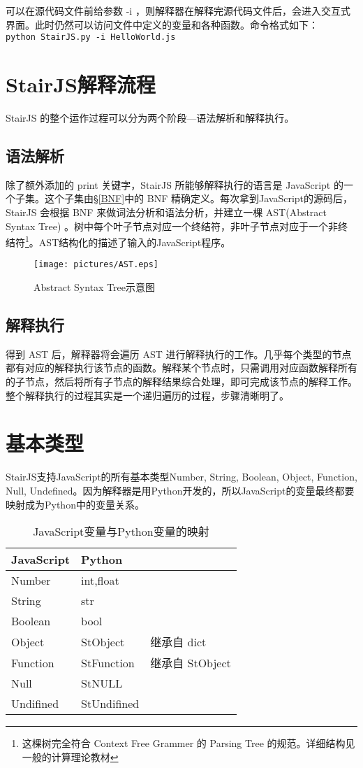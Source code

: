 \documentclass[a4paper]{article}
\begin{document}
\begin{CJK}{UTF8}{gbsn}
            可以在源代码文件前给参数 -i ，则解释器在解释完源代码文件后，会进入交互式界面。此时仍然可以访问文件中定义的变量和各种函数。命令格式如下：\\
            {\tt python StairJS.py -i HelloWorld.js}


\section{StairJS解释流程}
    StairJS 的整个运作过程可以分为两个阶段---语法解析和解释执行。
    \subsection{语法解析}
        除了额外添加的 print 关键字，StairJS 所能够解释执行的语言是 JavaScript 的一个子集。这个子集由\S\ref{BNF}中的 BNF 精确定义。每次拿到JavaScript的源码后， StairJS 会根据 BNF 来做词法分析和语法分析，并建立一棵 AST(Abstract Syntax Tree) 。树中每个叶子节点对应一个终结符，非叶子节点对应于一个非终结符\footnote{这棵树完全符合 Context Free Grammer 的 Parsing Tree 的规范。详细结构见一般的计算理论教材}。AST结构化的描述了输入的JavaScript程序。\\
        \begin{figure}[h]
        \center
        \texttt{[image: pictures/AST.eps]}
        \caption{Abstract Syntax Tree示意图}
        \end{figure}

    \subsection{解释执行}
        得到 AST 后，解释器将会遍历 AST 进行解释执行的工作。几乎每个类型的节点都有对应的解释执行该节点的函数。解释某个节点时，只需调用对应函数解释所有的子节点，然后将所有子节点的解释结果综合处理，即可完成该节点的解释工作。整个解释执行的过程其实是一个递归遍历的过程，步骤清晰明了。
\section{基本类型}
    StairJS支持JavaScript的所有基本类型Number, String, Boolean, Object, Function, Null, Undefined。因为解释器是用Python开发的，所以JavaScript的变量最终都要映射成为Python中的变量关系。
    \begin{table}[h]
        \center
        \begin{tabular}{lll}
            JavaScript & Python \\
            \hline
            Number      & int,float \\
            String      & str \\
            Boolean     & bool \\
            Object      & StObject    & 继承自 dict \\
            Function    & StFunction  & 继承自 StObject \\
            Null        & StNULL \\
            Undifined   & StUndifined \\
        \end{tabular}
        \caption{JavaScript变量与Python变量的映射}
    \end{table}


\end{CJK}
\end{document}
